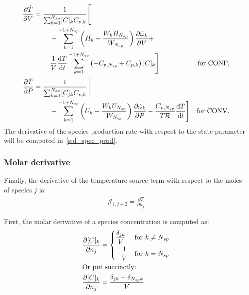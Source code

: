 \documentclass[12pt,number,sort&compress]{elsarticle}
\begin{document}
\begin{subequations}
\label{e:dTdotdE_nojac}
\begin{align}
 \frac{\partial\dot{T}}{\partial{V}} &= \frac{1}{\sum_{k=1}^{\ns/} [C]_{k} {C_{p, k}}} \Biggl[ \nonumber \\
				     & \mathindent - \sum_{k=1}^{-1 + \ns/} \left(H_{k} - \frac{W_{k} H_{\ns/}}{W_{\ns/}}\right) \frac{\partial \dot{\omega}_{k} }{\partial V } + & \nonumber \\
				     & \mathindent  \frac{1}{V} \frac{\text{d} T }{\text{d} t } \sum_{k=1}^{-1 + \ns/} \left(- {C_{p, \ns/}} + {C_{p, k}}\right) [C]_{k}\Biggr] & \text{\dconp/,} \\
 \frac{\partial\dot{T}}{\partial{P}} &= \frac{1}{\sum_{k=1}^{\ns/} [C]_{k} {C_{v, k}}} \Biggl[ \nonumber \\
				     & \mathindent - \sum_{k=1}^{-1 + \ns/} \left(U_{k} - \frac{W_{k} U_{\ns/}}{W_{\ns/}}\right) \frac{\partial \dot{\omega}_{k} }{\partial P } - \frac{{C_{v, \ns/}}}{T \Ru/} \frac{\text{d} T }{\text{d} t } \Biggr] & \text{\dconv/.}
\end{align}
\end{subequations}
The derivative of the species production rate with respect to the state parameter will be computed in~\cref{s:d_spec_prod}.

\subsubsection{Molar derivative}
Finally, the derivative of the temperature source term with respect to the moles of species $j$ is:
\begin{align}
 \label{e:dTdotdnj_init}
 \mathcal{J}_{1,j + 2} = \frac{\partial\dot{T}}{\partial{n_j}}
\end{align}

First, the molar derivative of a species concentration is computed as:
\begin{align}
 \frac{\partial [C]_k}{\partial n_j} &=
 \begin{dcases}
 \frac{\delta_{j k}}{V} & \text{for }k \ne \ns/ \\
 -\frac{1}{V} & \text{for }k = \ns/
 \end{dcases} \\
\intertext{Or put succinctly:}
\label{e:dck_dnj}
\frac{\partial [C]_k}{\partial n_j} &= \frac{\delta_{j k} - \delta_{\ns/ k}}{V}
\end{align}
\end{document}
